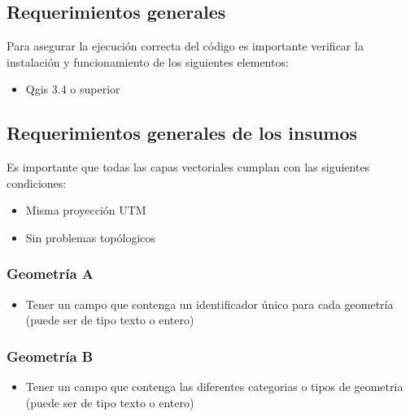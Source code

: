 \documentclass[letterpaper,10pt,spanish]{sphinxmanual}
\begin{document}
\subsection{Requerimientos generales}
\label{\detokenize{nivel_geometrias:requerimientos-generales}}
Para asegurar la ejecución correcta del código es importante
verificar la instalación y funcionamiento de los siguientes elementos:
\begin{itemize}
\item {} 
Qgis 3.4 o superior

\end{itemize}


\subsection{Requerimientos generales de los insumos}
\label{\detokenize{nivel_geometrias:requerimientos-generales-de-los-insumos}}
Es importante que todas las capas vectoriales cumplan con las siguientes condiciones:
\begin{itemize}
\item {} 
Misma proyección UTM

\item {} 
Sin problemas topólogicos

\end{itemize}


\subsubsection{Geometría A}
\label{\detokenize{nivel_geometrias:geometria-a}}\begin{itemize}
\item {} 
Tener un campo que contenga un identificador único para cada geometría (puede ser de tipo texto o entero)

\end{itemize}


\subsubsection{Geometría B}
\label{\detokenize{nivel_geometrias:geometria-b}}\begin{itemize}
\item {} 
Tener un campo que contenga las diferentes categorias o tipos de geometria (puede ser de tipo texto o entero)

\end{itemize}
\end{document}
